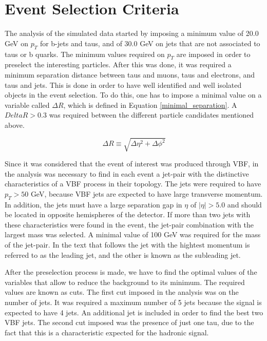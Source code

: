 \chapter{Event Selection Criteria}
\label{Event_selection_criteria_chapter}

The analysis of the simulated data started by imposing a minimum value of 20.0 GeV on $p_T$ for b-jets and taus, and of 30.0 GeV on jets that are not associated to taus or b quarks. The minimum values required on $p_T$ are imposed in order to preselect the interesting particles. After this was done, it was required a minimum separation distance between taus and muons, taus and electrons, and taus and jets. This is done in order to have well identified and well isolated objects in the event selection. To do this, one has to impose a minimal value on a variable called $\Delta R$, which is defined in Equation \ref{minimal_separation}. A $Delta R > 0.3$ was required between the different particle candidates mentioned above. 

\begin{equation}
\Delta R \equiv \sqrt{\Delta \eta ^2 + \Delta \phi ^2}
\label{minimal_separation}
\end{equation}

Since it was considered that the event of interest was produced through VBF, in the analysis was necessary to find in each event a jet-pair with the distinctive characteristics of a VBF process in their topology. The jets were required to have $p_{T} > 50$ GeV, because VBF jets are expected to have large transverse momentum. In addition, the jets must have a large separation gap in $\eta$ of $|\eta| > 5.0$ and should be located in opposite hemispheres of the detector. If more than two jets with these characteristics were found in the event, the jet-pair combination with the largest mass was selected. A minimal value of 100 GeV was required for the mass of the jet-pair. In the text that follows the jet with the hightest momentum is referred to as the leading jet, and the other is known as the subleading jet.

After the preselection process is made, we have to find the optimal values of the variables that allow to reduce the background to its minimum. The required values are known as cuts. The first cut imposed in the analysis was on the number of jets. It was required a maximum number of 5 jets because the signal is expected to have 4 jets. An additional jet is included in order to find the best two VBF jets. The second cut imposed was the presence of just one tau, due to the fact that this is a characteristic expected for the hadronic signal. 


